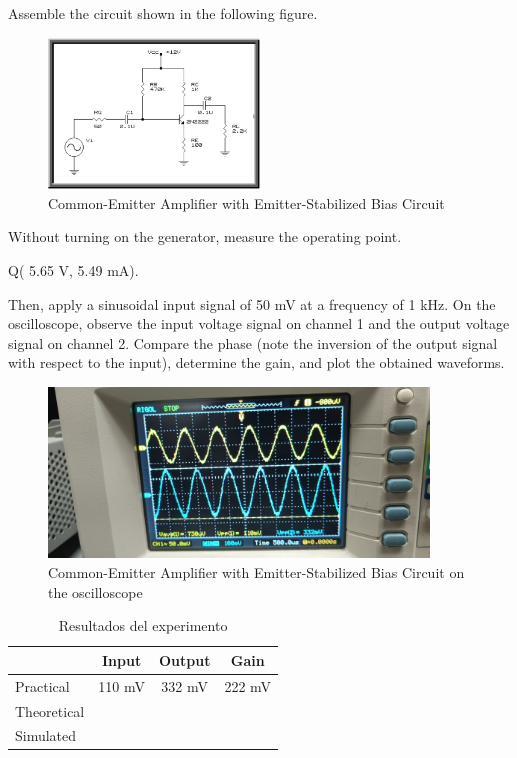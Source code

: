 Assemble the circuit shown in the following figure.
\begin{figure}[h]
    \centering
    \includegraphics[width = 0.5\textwidth]{Imagenes/Imagenes_Juan/Common-Emitter Amplifier with Emitter-Stabilized Bias Circuit.PNG}
    \caption{Common-Emitter Amplifier with Emitter-Stabilized Bias Circuit}
    \label{circuit2}
\end{figure}

Without turning on the generator, measure the operating point.

\begin{center}
    Q( 5.65 V, 5.49 mA).
\end{center}

Then, apply a sinusoidal input signal of 50 mV at a frequency of 1 kHz.
On the oscilloscope, observe the input voltage signal on channel 1 and the output voltage signal on channel 
2. Compare the phase (note the inversion of the output signal with respect to the input), determine the 
gain, and plot the obtained waveforms.

\begin{figure}[h]
    \centering
    \includegraphics[width = 0.9\textwidth]{Imagenes/Imagenes_Juan/Osciloscopio Circuito 2.jpg}
    \caption{Common-Emitter Amplifier with Emitter-Stabilized Bias Circuit on the oscilloscope}
    \label{circuit2Osciloscopio}
\end{figure}

\begin{table}[H]
\centering
\caption{Resultados del experimento}
\label{tab:resultados2}
\begin{tabular}{lccc} %
\toprule
 & Input & Output & Gain \\ 
\midrule
Practical   & 110 mV & 332 mV & 222 mV\\ 
Theoretical &  &  & \\ 
Simulated   &  &  &  \\ 
\bottomrule
\end{tabular}
\end{table}




